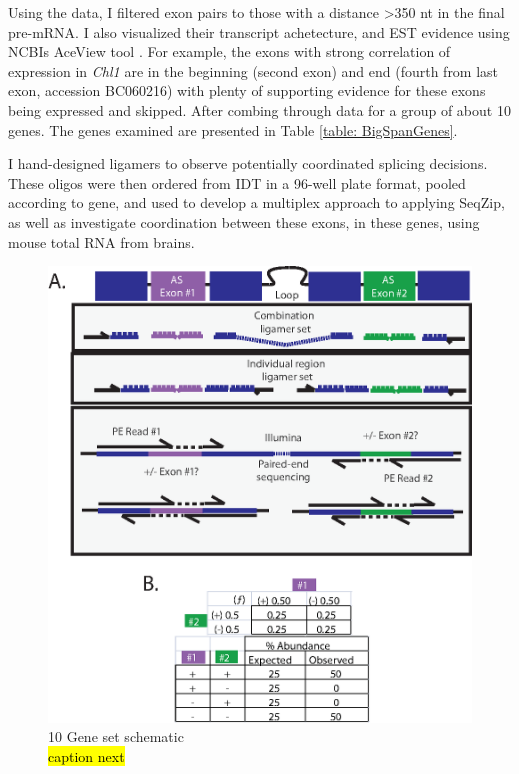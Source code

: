 Using the \citet{Fagnani2007} data, I filtered exon pairs to those with a distance >350 nt in the final pre-mRNA. I also visualized their transcript achetecture, and EST evidence using NCBIs AceView tool \citep{Thierry-Mieg2006}. For example, the exons with strong correlation of expression in \textit{Chl1} are in the beginning (second exon) and end (fourth from last exon, accession BC060216) with plenty of supporting evidence for these exons being expressed and skipped. After combing through \citep{Fagnani2007} data for a group of about 10 genes. The genes examined are presented in Table \ref{table: BigSpanGenes}.



I hand-designed ligamers to observe potentially coordinated splicing decisions. These oligos were then ordered from IDT in a 96-well plate format, pooled according to gene, and used to develop a multiplex approach to applying SeqZip, as well as investigate coordination between these exons, in these genes, using mouse total RNA from brains.

\begin{figure}[htbp]
	\centering 
	\includegraphics{Figures/Chapter2/10GeneSetSchematic.eps}
	\caption[10 Gene Set schematic]
	{
		10 Gene set schematic\\
		\hl{caption next}
	}
	\label{fig:Original SeqZip Diagram}
\end{figure}


